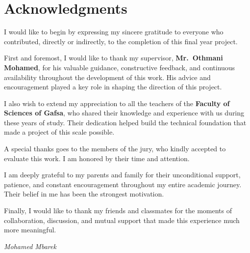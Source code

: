 
\cleardoublepage
\thispagestyle{empty}

\chapter*{Acknowledgments}


I would like to begin by expressing my sincere gratitude to everyone who contributed, directly or indirectly, to the completion of this final year project.

\vspace{5pt}

First and foremost, I would like to thank my supervisor, \textbf{Mr.~Othmani Mohamed}, for his valuable guidance, constructive feedback, and continuous availability throughout the development of this work. His advice and encouragement played a key role in shaping the direction of this project.

\vspace{5pt}

I also wish to extend my appreciation to all the teachers of the \textbf{Faculty of Sciences of Gafsa}, who shared their knowledge and experience with us during these years of study. Their dedication helped build the technical foundation that made a project of this scale possible.

\vspace{5pt}

A special thanks goes to the members of the jury, who kindly accepted to evaluate this work. I am honored by their time and attention.

\vspace{5pt}

I am deeply grateful to my parents and family for their unconditional support, patience, and constant encouragement throughout my entire academic journey. Their belief in me has been the strongest motivation.

\vspace{5pt}

Finally, I would like to thank my friends and classmates for the moments of collaboration, discussion, and mutual support that made this experience much more meaningful.

\vspace{10pt}

\begin{flushright}
\textit{Mohamed Mbarek}
\end{flushright}
